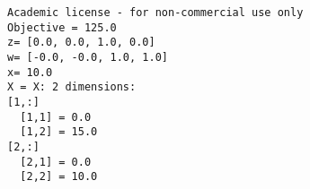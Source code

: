 \begin{codeCell}
    
    \begin{Verbatim}[commandchars=\\\{\}]
Academic license - for non-commercial use only
Objective = 125.0
z= [0.0, 0.0, 1.0, 0.0]
w= [-0.0, -0.0, 1.0, 1.0]
x= 10.0
X = X: 2 dimensions:
[1,:]
  [1,1] = 0.0
  [1,2] = 15.0
[2,:]
  [2,1] = 0.0
  [2,2] = 10.0

    \end{Verbatim}


\end{codeCell}